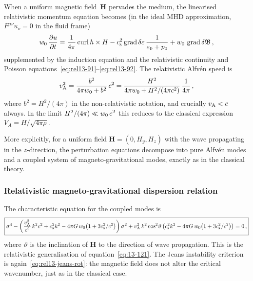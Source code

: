 When a uniform magnetic field~$\mathbf{H}$ pervades the medium, the
linearised relativistic momentum equation becomes (in the ideal MHD
approximation, $F^{\mu\nu}u_{\nu}=0$ in the fluid frame)
\begin{equation}
  w_{0}\,\frac{\partial u}{\partial t}
  = \frac{1}{4\pi}\operatorname{curl}h\times H
    - c_{\mathrm{s}}^{2}\operatorname{grad}\delta\varepsilon\,
      \frac{1}{\varepsilon_{0}+p_{0}}
    + w_{0}\,\operatorname{grad}\delta\mathfrak{B}\,,
  \label{eq:rel13-109}
\end{equation}
supplemented by the induction equation and the relativistic continuity
and Poisson equations~\eqref{eq:rel13-91}--\eqref{eq:rel13-92}.  The
relativistic Alfv\'en speed is
\begin{equation}
  v_{\mathrm{A}}^{2}
  = \frac{b^{2}}{4\pi w_{0} + b^{2}}\,c^{2}
  = \frac{H^{2}}{4\pi w_{0} + H^{2}/(4\pi c^{2})}\,
    \frac{1}{4\pi}\,,
  \label{eq:rel13-vA}
\end{equation}
where $b^{2} = H^{2}/(4\pi)$ in the non-relativistic notation, and
crucially $v_{\mathrm{A}} < c$ always.  In the limit $H^{2}/(4\pi) \ll
w_{0}\,c^{2}$ this reduces to the classical expression
$V_{A} = H/\sqrt{4\pi\rho}$.

More explicitly, for a uniform field $\mathbf{H}=(0,H_{y},H_{z})$ with
the wave propagating in the $z$-direction, the perturbation equations
decompose into pure Alfv\'en modes and a coupled system of
magneto-gravitational modes, exactly as in the classical theory.

\subsubsection*{Relativistic magneto-gravitational dispersion relation}

The characteristic equation for the coupled modes is
\begin{equation}
\boxed{
  \sigma^{4}
  - \left(\frac{v_{\mathrm{A}}^{2}}{c^{2}}\,k^{2}c^{2}
    + c_{\mathrm{s}}^{2}k^{2}
    - 4\pi G\,w_{0}\bigl(1+3c_{\mathrm{s}}^{2}/c^{2}\bigr)
    \right)\sigma^{2}
  + v_{\mathrm{A}}^{2}\,k^{2}\cos^{2}\!\vartheta
    \left(c_{\mathrm{s}}^{2}k^{2}
    - 4\pi G\,w_{0}\bigl(1+3c_{\mathrm{s}}^{2}/c^{2}\bigr)
    \right)
  = 0\,,}
  \label{eq:rel13-121}
\end{equation}
where $\vartheta$ is the inclination of $\mathbf{H}$ to the direction
of wave propagation.  This is the relativistic generalisation of
equation~\eqref{eq:13-121}.  The Jeans instability criterion is
again~\eqref{eq:rel13-jeans-rot}: the magnetic field does not alter the
critical wavenumber, just as in the classical case.

